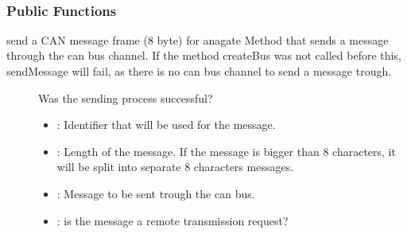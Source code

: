 \documentclass[a4paper,10pt,english]{sphinxmanual}
\begin{document}
\begin{fulllineitems}
\label{\detokenize{classestracing:_CPPv410AnaCanScan}}%
\pysigstartmultiline
{}%
\pysigstopmultiline~\subsubsection*{Public Functions}

\begin{fulllineitems}
\label{\detokenize{classestracing:_CPPv4N10AnaCanScan11sendMessageEshPhb}}%
\pysigstartmultiline
{}%
\pysigstopmultiline
send a CAN message frame (8 byte) for anagate Method that sends a message through the can bus channel. If the method createBus was not called before this, sendMessage will fail, as there is no can bus channel to send a message trough. \begin{description}
\item[{}] \leavevmode
Was the sending process successful? 

\item[{}] \leavevmode\begin{itemize}
\item {} 
: Identifier that will be used for the message. 

\item {} 
: Length of the message. If the message is bigger than 8 characters, it will be split into separate 8 characters messages. 

\item {} 
: Message to be sent trough the can bus. 

\item {} 
: is the message a remote transmission request? 


\end{itemize}
\end{description}
\end{fulllineitems}
\end{fulllineitems}
\end{document}
